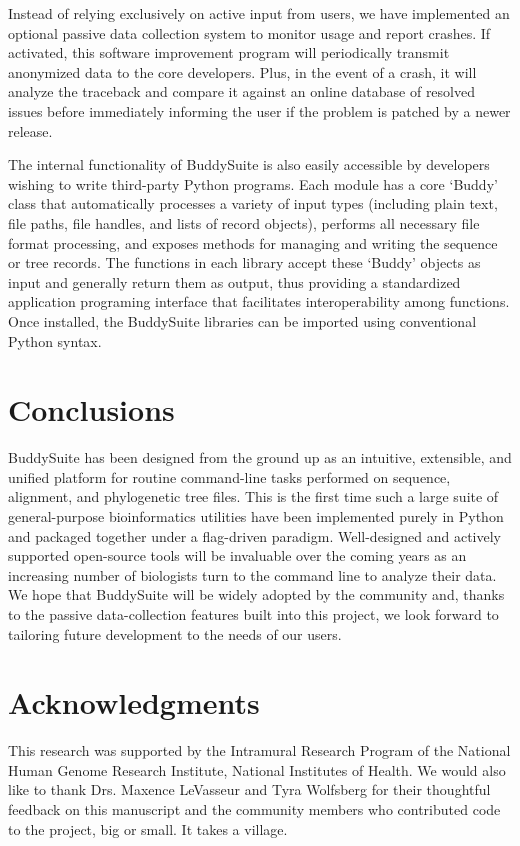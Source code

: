 \documentclass[nogrid]{MBE_article}%
\begin{document}
Instead of relying exclusively on active input from users, we have implemented an optional passive data collection system to monitor usage and report crashes. If activated, this software improvement program will periodically transmit anonymized data to the core developers. Plus, in the event of a crash, it will analyze the traceback and compare it against an online database of resolved issues before immediately informing the user if the problem is patched by a newer release.

The internal functionality of BuddySuite is also easily accessible by developers wishing to write third-party Python programs. Each module has a core `Buddy' class that automatically processes a variety of input types (including plain text, file paths, file handles, and lists of record objects), performs all necessary file format processing, and exposes methods for managing and writing the sequence or tree records. The functions in each library accept these `Buddy' objects as input and generally return them as output, thus providing a standardized application programing interface that facilitates interoperability among functions. Once installed, the BuddySuite libraries can be imported using conventional Python syntax.

\section{Conclusions}
BuddySuite has been designed from the ground up as an intuitive, extensible, and unified platform for routine command-line tasks performed on sequence, alignment, and phylogenetic tree files. This is the first time such a large suite of general-purpose bioinformatics utilities have been implemented purely in Python and packaged together under a flag-driven paradigm. Well-designed and actively supported open-source tools will be invaluable over the coming years as an increasing number of biologists turn to the command line to analyze their data. We hope that BuddySuite will be widely adopted by the community and, thanks to the passive data-collection features built into this project, we look forward to tailoring future development to the needs of our users.


\section{Acknowledgments}
This research was supported by the Intramural Research Program of the National Human Genome Research Institute, National Institutes of Health. We would also like to thank Drs. Maxence LeVasseur and Tyra Wolfsberg for their thoughtful feedback on this manuscript and the community members who contributed code to the project, big or small. It takes a village.
\end{document}
